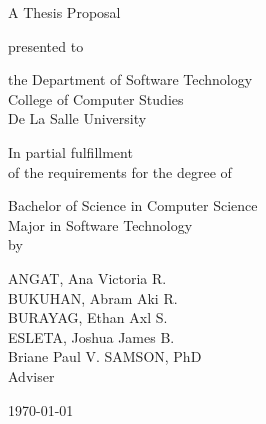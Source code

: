 %
%
%                 

\begin{titlepage}
\centering



\vspace{1.5cm}

A Thesis Proposal\\

\vspace{0.5cm}

presented to\\

\vspace{0.5cm}

the Department of Software Technology\\
College of Computer Studies\\
De La Salle University

\vspace{1cm}

In partial fulfillment\\
of the requirements for the degree of\\

\vspace{0.5cm}

Bachelor of Science in Computer Science\\
Major in Software Technology
\vspace{1cm}
\\by\\


\vspace{1cm}

ANGAT, Ana Victoria R.  \\
BUKUHAN, Abram Aki R.  \\
BURAYAG, Ethan Axl S.  \\
ESLETA, Joshua James B.  \\

\vspace{1.75cm}
Briane Paul V. SAMSON, PhD \\
Adviser

\vspace{1.75cm}
\today
\end{titlepage}
